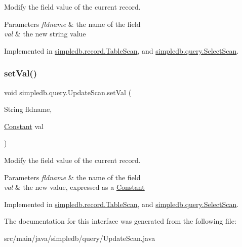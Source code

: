 Modify the field value of the current record. 
\begin{DoxyParams}{Parameters}
{\em fldname} & the name of the field \\
\hline
{\em val} & the new string value \\
\hline
\end{DoxyParams}


Implemented in \hyperlink{classsimpledb_1_1record_1_1TableScan_a0d7d00cd93ce179297abf17b5900b750}{simpledb.\+record.\+Table\+Scan}, and \hyperlink{classsimpledb_1_1query_1_1SelectScan_a89d69e60a20cab136352370e7e27d1db}{simpledb.\+query.\+Select\+Scan}.

\mbox{\label{interfacesimpledb_1_1query_1_1UpdateScan_a70fdd638a395be56dcbc65ecd791f075}} 
\subsubsection{\texorpdfstring{set\+Val()}{setVal()}}
{\footnotesize\ttfamily void simpledb.\+query.\+Update\+Scan.\+set\+Val (\begin{DoxyParamCaption}\item[{String}]{fldname,  }\item[{\hyperlink{classsimpledb_1_1query_1_1Constant}{Constant}}]{val }\end{DoxyParamCaption})}

Modify the field value of the current record. 
\begin{DoxyParams}{Parameters}
{\em fldname} & the name of the field \\
\hline
{\em val} & the new value, expressed as a \hyperlink{classsimpledb_1_1query_1_1Constant}{Constant} \\
\hline
\end{DoxyParams}


Implemented in \hyperlink{classsimpledb_1_1record_1_1TableScan_aa43095f81b040417816d8493b66a91d3}{simpledb.\+record.\+Table\+Scan}, and \hyperlink{classsimpledb_1_1query_1_1SelectScan_a2c767921954b2e2ea83ef5d90712b64f}{simpledb.\+query.\+Select\+Scan}.



The documentation for this interface was generated from the following file\+:\begin{DoxyCompactItemize}
\item 
src/main/java/simpledb/query/Update\+Scan.\+java\end{DoxyCompactItemize}
